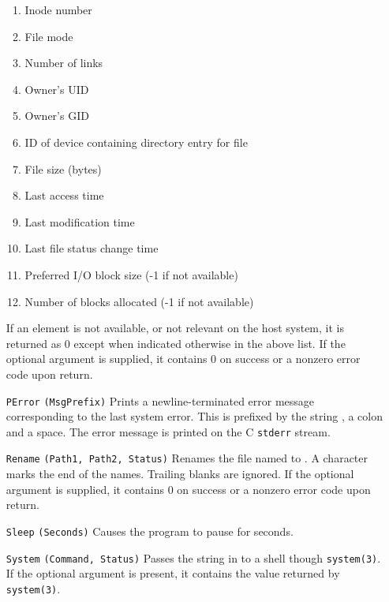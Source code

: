 \begin{itemize}
\begin{enumerate}
      \item Inode number 
      \item File mode 
      \item Number of links 
      \item Owner's UID 
      \item Owner's GID 
      \item ID of device containing directory entry for file
      \item File size (bytes) 
      \item Last access time 
      \item Last modification time 
      \item Last file status change time 
      \item Preferred I/O block size (-1 if not available) 
      \item Number of blocks allocated (-1 if not available)
    \end{enumerate}
    If an element is not available, or not relevant on the host system,
    it is returned as 0 except when indicated otherwise in the above list.
    If the optional  argument is supplied, it contains 0 on
    success or a nonzero error code upon return.
  \item[\tt PError]{\tt (MsgPrefix)}
    Prints a newline-terminated error message corresponding to the last
    system error. This is prefixed by the string ,
    a colon and a space.  The error message is printed on the C
    {\tt stderr} stream.
  \item[\tt Rename]{\tt (Path1, Path2, Status)}
    Renames the file named  to . A 
    character marks the end of the names.  Trailing blanks are ignored.
    If the optional  argument is supplied, it contains 0
    on success or a nonzero error code upon return.
  \item[\tt Sleep]{\tt (Seconds)}
    Causes the program to pause for  seconds.
  \item[\tt System]{\tt (Command, Status)}
    Passes the string in  to a shell though {\tt system(3)}.
    If the optional argument  is present, it contains the
    value returned by {\tt system(3)}.
\end{itemize}

 
